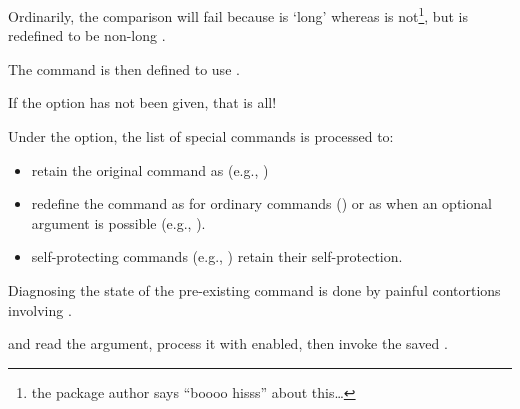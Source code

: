 \documentclass[a4paper]{article}
\begin{document}
Ordinarily, the comparison  will fail 
because  is `long' whereas  is
not\footnote{the package author says ``boooo hisss'' about this\dots},
but  is redefined to be non-long .

The \cs{_} command is then defined to use .

If the \option[strings] option has not been given, that is all!

Under the \option[strings] option, the list of special commands is processed to:
\begin{itemize}
\item retain the original command as  (e.g., )
\item redefine the command as  for ordinary
  commands () or as
   when an optional argument is possible
  (e.g., ). 
\item self-protecting commands (e.g., ) retain their
  self-protection.
\end{itemize}
Diagnosing the state of the pre-existing command is done by painful
contortions involving .

 and  read the argument, process it with
 enabled, then invoke the saved .
\end{document}
